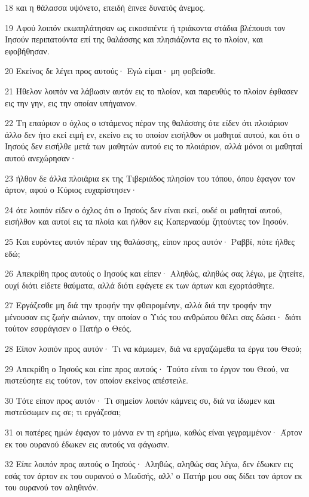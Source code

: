 \par 18 και η θάλασσα υψόνετο, επειδή έπνεε δυνατός άνεμος.
\par 19 Αφού λοιπόν εκωπηλάτησαν ως εικοσιπέντε ή τριάκοντα στάδια βλέπουσι τον Ιησούν περιπατούντα επί της θαλάσσης και πλησιάζοντα εις το πλοίον, και εφοβήθησαν.
\par 20 Εκείνος δε λέγει προς αυτούς· Εγώ είμαι· μη φοβείσθε.
\par 21 Ήθελον λοιπόν να λάβωσιν αυτόν εις το πλοίον, και παρευθύς το πλοίον έφθασεν εις την γην, εις την οποίαν υπήγαινον.
\par 22 Τη επαύριον ο όχλος ο ιστάμενος πέραν της θαλάσσης ότε είδεν ότι πλοιάριον άλλο δεν ήτο εκεί ειμή εν, εκείνο εις το οποίον εισήλθον οι μαθηταί αυτού, και ότι ο Ιησούς δεν εισήλθε μετά των μαθητών αυτού εις το πλοιάριον, αλλά μόνοι οι μαθηταί αυτού ανεχώρησαν·
\par 23 ήλθον δε άλλα πλοιάρια εκ της Τιβεριάδος πλησίον του τόπου, όπου έφαγον τον άρτον, αφού ο Κύριος ευχαρίστησεν·
\par 24 ότε λοιπόν είδεν ο όχλος ότι ο Ιησούς δεν είναι εκεί, ουδέ οι μαθηταί αυτού, εισήλθον και αυτοί εις τα πλοία και ήλθον εις Καπερναούμ ζητούντες τον Ιησούν.
\par 25 Και ευρόντες αυτόν πέραν της θαλάσσης, είπον προς αυτόν· Ραββί, πότε ήλθες εδώ;
\par 26 Απεκρίθη προς αυτούς ο Ιησούς και είπεν· Αληθώς, αληθώς σας λέγω, με ζητείτε, ουχί διότι είδετε θαύματα, αλλά διότι εφάγετε εκ των άρτων και εχορτάσθητε.
\par 27 Εργάζεσθε μη διά την τροφήν την φθειρομένην, αλλά διά την τροφήν την μένουσαν εις ζωήν αιώνιον, την οποίαν ο Υιός του ανθρώπου θέλει σας δώσει· διότι τούτον εσφράγισεν ο Πατήρ ο Θεός.
\par 28 Είπον λοιπόν προς αυτόν· Τι να κάμωμεν, διά να εργαζώμεθα τα έργα του Θεού;
\par 29 Απεκρίθη ο Ιησούς και είπε προς αυτούς· Τούτο είναι το έργον του Θεού, να πιστεύσητε εις τούτον, τον οποίον εκείνος απέστειλε.
\par 30 Τότε είπον προς αυτόν· Τι σημείον λοιπόν κάμνεις συ, διά να ίδωμεν και πιστεύσωμεν εις σε; τι εργάζεσαι;
\par 31 οι πατέρες ημών έφαγον το μάννα εν τη ερήμω, καθώς είναι γεγραμμένον· Άρτον εκ του ουρανού έδωκεν εις αυτούς να φάγωσιν.
\par 32 Είπε λοιπόν προς αυτούς ο Ιησούς· Αληθώς, αληθώς σας λέγω, δεν έδωκεν εις εσάς τον άρτον εκ του ουρανού ο Μωϋσής, αλλ' ο Πατήρ μου σας δίδει τον άρτον εκ του ουρανού τον αληθινόν.
